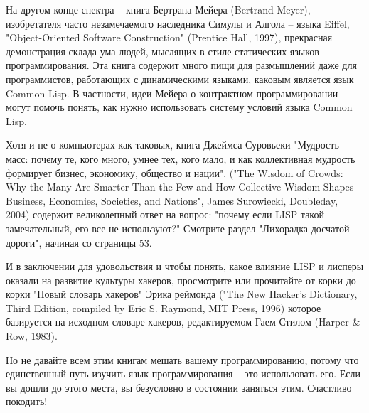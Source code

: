 На другом конце спектра -- книга Бертрана Мейера (Bertrand Meyer), изобретателя часто
незамечаемого наследника Симулы и Алгола -- языка Eiffel, "Object-Oriented Software
Construction" (Prentice Hall, 1997), прекрасная демонстрация склада ума людей, мыслящих в
стиле статических языков программирования. Эта книга содержит много пищи для размышлений
даже для программистов, работающих с динамическими языками, каковым является язык Common
Lisp.  В частности, идеи Мейера о контрактном программировании могут помочь понять, как
нужно использовать систему условий языка Common Lisp.

Хотя и не о компьютерах как таковых, книга Джеймса Суровьеки "Мудрость масс: почему те,
кого много, умнее тех, кого мало, и как коллективная мудрость формирует бизнес, экономику,
общество и нации". ("The Wisdom of Crowds: Why the Many Are Smarter Than the Few and How
Collective Wisdom Shapes Business, Economies, Societies, and Nations", James Surowiecki,
Doubleday, 2004) содержит великолепный ответ на вопрос: "почему если LISP такой
замечательный, его все не используют?" Смотрите раздел "Лихорадка досчатой дороги",
начиная со страницы 53.

И в заключении для удовольствия и чтобы понять, какое влияние LISP и лисперы оказали на
развитие культуры хакеров, просмотрите или прочитайте от корки до корки "Новый словарь
хакеров" Эрика реймонда ("The New Hacker's Dictionary, Third Edition, compiled by Eric
S. Raymond, MIT Press, 1996) которое базируется на исходном словаре хакеров, редактируемом
Гаем Стилом (Harper \& Row, 1983).

Но не давайте всем этим книгам мешать вашему программированию, потому что единственный
путь изучить язык программирования -- это использовать его. Если вы дошли до этого места,
вы безусловно в состоянии заняться этим.  Счастливо покодить!


